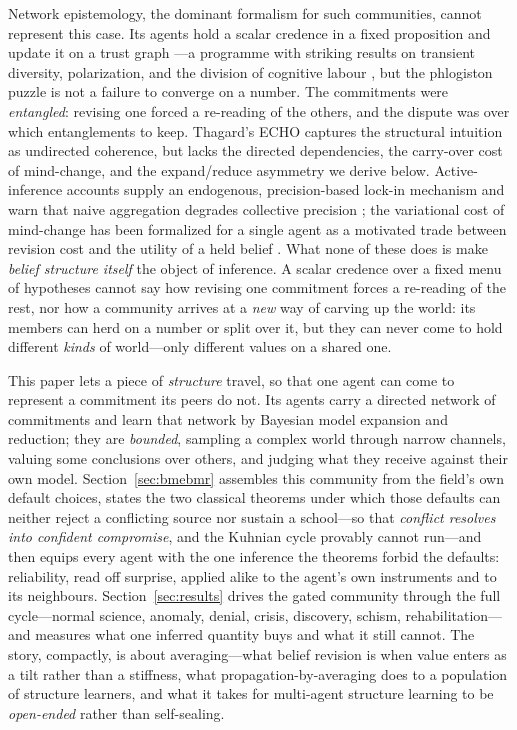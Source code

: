 \documentclass[runningheads]{llncs}
\begin{document}
Network epistemology, the dominant formalism for such communities, cannot represent this case. Its
agents hold a scalar credence in a fixed proposition and update it on a trust graph
\citep{zollman2010,oconnor2019,zollman2013}---a programme with striking results on transient
diversity, polarization, and the division of cognitive labour
\citep{jonard2025,michelini2023,kitcher1990,strevens2003}, but the phlogiston puzzle is not a failure
to converge on a number. The commitments were \emph{entangled}: revising one forced a re-reading of
the others, and the dispute was over which entanglements to keep. Thagard's ECHO
\citep{thagard1989,thagard1990} captures the structural intuition as undirected coherence, but lacks
the directed dependencies, the carry-over cost of mind-change, and the expand/reduce asymmetry we
derive below. Active-inference accounts supply an endogenous, precision-based lock-in mechanism
\citep{albarracin2022} and warn that naive aggregation degrades collective precision
\citep{friston2023federated,waade2025}; the variational cost of mind-change has been formalized for a
single agent as a motivated trade between revision cost and the utility of a held belief
\citep{hyland2025}. What none of these does is make \emph{belief structure itself} the object of
inference. A scalar credence over a fixed menu of hypotheses cannot say how revising one commitment
forces a re-reading of the rest, nor how a community arrives at a \emph{new} way of carving up the
world: its members can herd on a number or split over it, but they can never come to hold different
\emph{kinds} of world---only different values on a shared one.

This paper lets a piece of \emph{structure} travel, so that one agent can come to represent a
commitment its peers do not. Its agents carry a directed network of commitments and learn that
network by Bayesian model expansion and reduction; they are \emph{bounded}, sampling a complex
world through narrow channels, valuing some conclusions over others, and judging what they
receive against their own model. Section~\ref{sec:bmebmr} assembles this community from the
field's own default choices, states the two classical theorems under which those defaults can
neither reject a conflicting source nor sustain a school---so that \emph{conflict resolves into
confident compromise}, and the Kuhnian cycle provably cannot run---and then equips every agent
with the one inference the theorems forbid the defaults: reliability, read off surprise, applied
alike to the agent's own instruments and to its neighbours.
Section~\ref{sec:results} drives the gated community through the full cycle---normal science,
anomaly, denial, crisis, discovery, schism, rehabilitation---and measures what one inferred
quantity buys and what it still cannot. The story, compactly, is about averaging---what belief
revision is when value enters as a tilt rather than a stiffness, what propagation-by-averaging
does to a population of structure learners, and what it takes for multi-agent structure learning
to be \emph{open-ended} rather than self-sealing.
\end{document}
